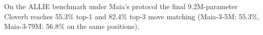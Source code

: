 On the ALLIE benchmark under Maia's protocol the final 9.2M-parameter Cloverb reaches 55.3\% top-1 and 82.4\% top-3 move matching (Maia-3-5M: 55.3\%, Maia-3-79M: 56.8\% on the same positions).